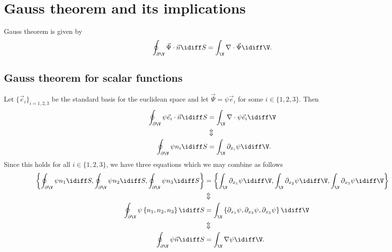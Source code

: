 \section{Gauss theorem and its implications}
Gauss theorem is given by
\begin{equation}\label{Eq2:GaussTheorem}
	\oint_{\partial\V} \vec{\Psi}\cdot\vec{n}\idiff S = \int_\V\nabla\cdot \vec{\Psi}\idiff\V.
\end{equation}

\subsection{Gauss theorem for scalar functions}
Let $\{\vec{e}_i\}_{i=1,2,3}$ be the standard basis for the euclidean space and let $\vec{\Psi}=\psi\vec{e}_i$ for some $i\in\{1,2,3\}$. Then
\begin{align*}
	\oint_{\partial\V} \psi\vec{e}_i\cdot\vec{n}\idiff S &= \int_\V\nabla\cdot \psi\vec{e}_i\idiff\V\\
	&\Updownarrow\\
	\oint_{\partial\V} \psi n_i\idiff S &= \int_\V\partial_{x_i} \psi\idiff\V.
\end{align*}
Since this holds for all $i\in\{1,2,3\}$, we have three equations which we may combine as follows
\begin{align}\notag
	\left\{\oint_{\partial\V} \psi n_1\idiff S,\oint_{\partial\V} \psi n_2\idiff S,\oint_{\partial\V} \psi n_3\idiff S\right\} &=
	\left\{\int_\V\partial_{x_1} \psi\idiff\V,\int_\V\partial_{x_2} \psi\idiff\V,\int_\V\partial_{x_3} \psi\idiff\V\right\}\\ \notag
	&\Updownarrow\\ \notag
	\oint_{\partial\V}\psi\left\{n_1,n_2,n_3\right\}\idiff S &=
	\int_\V\left\{\partial_{x_1} \psi,\partial_{x_2} \psi,\partial_{x_3} \psi\right\}\idiff\V\\ \notag
	&\Updownarrow\\ \label{Eq2:GaussImplication}
	\oint_{\partial\V}\psi\vec{n}\idiff S &=
	\int_\V\nabla \psi\idiff\V.
\end{align}

